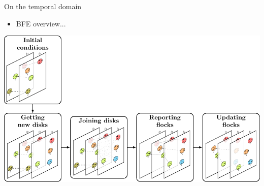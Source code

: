 \documentclass{beamer}
\begin{document}
    \begin{frame}{On the temporal domain}
        \begin{itemize} \item BFE overview... \end{itemize} \vspace{0.5cm}

        \centering
        \includegraphics[width=\textwidth]{../thesis/chapter4/figures/Temporal/f_stages}
    \end{frame}
\end{document}
